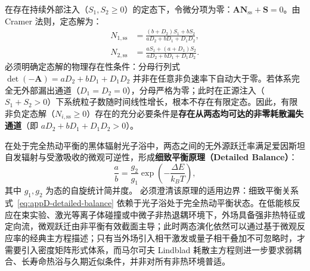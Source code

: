 在存在持续外部注入（$S_1, S_2 \ge 0$）的定态下，令微分项为零：$\mathbf{A} \mathbf{N}_{\mathrm{ss}} + \mathbf{S} = 0$。由 Cramer 法则，定态解为：
\begin{align}
N_{1, \mathrm{ss}} &= \frac{(b + D_2) S_1 + b S_2}{a D_2 + b D_1 + D_1 D_2}, \label{eq:appD-n1-ss} \\
N_{2, \mathrm{ss}} &= \frac{a S_1 + (a + D_1) S_2}{a D_2 + b D_1 + D_1 D_2}. \label{eq:appD-n2-ss}
\end{align}
必须明确定态解的物理存在性条件：分母行列式 $\det(-\mathbf{A}) = a D_2 + b D_1 + D_1 D_2$ 并非在任意非负速率下自动大于零。若体系完全无外部漏出通道（$D_1 = D_2 = 0$），分母严格为零；此时在正源注入（$S_1 + S_2 > 0$）下系统粒子数随时间线性增长，根本不存在有限定态。因此，有限非负定态解（$N_{i,\mathrm{ss}} \ge 0$）存在的充分必要条件是\textbf{存在从两态均可达的非零耗散漏失通道}（即 $a D_2 + b D_1 + D_1 D_2 > 0$）。

在处于完全热动平衡的黑体辐射光子浴中，两态之间的无外源跃迁率满足爱因斯坦自发辐射与受激吸收的微观可逆性，形成\textbf{细致平衡原理（Detailed Balance）}：
\begin{equation}\label{eq:appD-detailed-balance}
\frac{a}{b} = \frac{g_2}{g_1} \exp\left( -\frac{\Delta E}{k_B T} \right),
\end{equation}
其中 $g_1, g_2$ 为态的自旋统计简并度。
必须澄清该原理的适用边界：细致平衡关系式~\eqref{eq:appD-detailed-balance} 依赖于光子浴处于完全热动平衡状态。在低能核反应在束实验、激光等离子体碰撞或中微子非热退耦环境下，外场具备强非热特征或定向流，微观跃迁由非平衡有效截面主导；此时两态演化依然可以通过基于微观反应率的经典主方程描述；只有当外场引入相干激发或量子相干叠加不可忽略时，才需要引入密度矩阵形式体系，而马尔可夫 Lindblad 耗散主方程则进一步要求弱耦合、长寿命热浴与久期近似条件，并非对所有非热环境普适。

